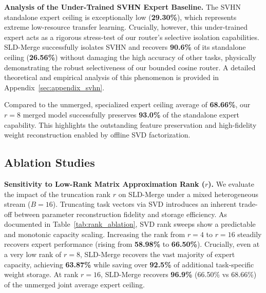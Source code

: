 \textbf{Analysis of the Under-Trained SVHN Expert Baseline.} 
The SVHN standalone expert ceiling is exceptionally low (\textbf{29.30\%}), which represents extreme low-resource transfer learning. Crucially, however, this under-trained expert acts as a rigorous stress-test of our router's selective isolation capabilities. SLD-Merge successfully isolates SVHN and recovers \textbf{90.6\%} of its standalone ceiling (\textbf{26.56\%}) without damaging the high accuracy of other tasks, physically demonstrating the robust selectiveness of our bounded cosine router. A detailed theoretical and empirical analysis of this phenomenon is provided in Appendix~\ref{sec:appendix_svhn}.

Compared to the unmerged, specialized expert ceiling average of \textbf{68.66\%}, our $r=8$ merged model successfully preserves \textbf{93.0\%} of the standalone expert capability. This highlights the outstanding feature preservation and high-fidelity weight reconstruction enabled by offline SVD factorization.

\subsection{Ablation Studies}

\textbf{Sensitivity to Low-Rank Matrix Approximation Rank ($r$).}
We evaluate the impact of the truncation rank $r$ on SLD-Merge under a mixed heterogeneous stream ($B=16$). Truncating task vectors via SVD introduces an inherent trade-off between parameter reconstruction fidelity and storage efficiency. As documented in Table~\ref{tab:rank_ablation}, SVD rank sweeps show a predictable and monotonic capacity scaling. Increasing the rank from $r=4$ to $r=16$ steadily recovers expert performance (rising from \textbf{58.98\%} to \textbf{66.50\%}). Crucially, even at a very low rank of $r=8$, SLD-Merge recovers the vast majority of expert capacity, achieving \textbf{63.87\%} while saving over \textbf{92.5\%} of additional task-specific weight storage. At rank $r=16$, SLD-Merge recovers \textbf{96.9\%} (66.50\% vs 68.66\%) of the unmerged joint average expert ceiling.

